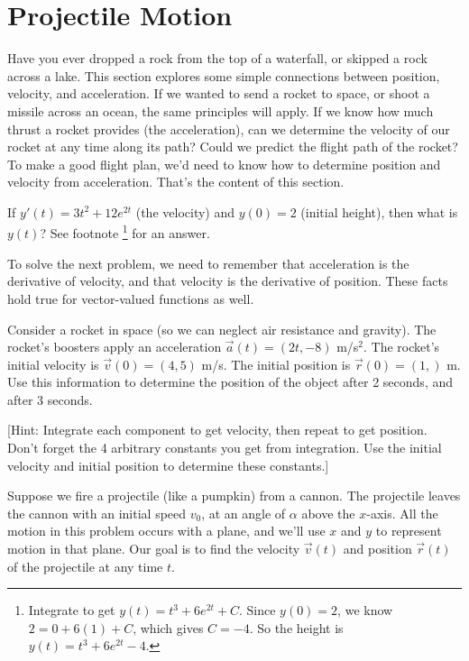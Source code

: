 \section{Projectile Motion}

Have you ever dropped a rock from the top of a waterfall, or skipped a rock across a lake. This section explores some simple connections between position, velocity, and acceleration. If we wanted to send a rocket to space, or shoot a missile across an ocean, the same principles will apply. If we know how much thrust a rocket provides (the acceleration), can we determine the velocity of our rocket at any time along its path?  Could we predict the flight path of the rocket? To make a good flight plan, we'd need to know how to determine position and velocity from acceleration.  That's the content of this section.  

\begin{review*}
 If $y'(t) = 3t^2+12e^{2t}$ (the velocity) and $y(0)=2$ (initial height), then what is $y(t)$? See footnote \footnote{Integrate to get $y(t) = t^3+6e^{2t}+C$. Since $y(0)=2$, we know $2=0+6(1)+C$, which gives $C=-4$. So the height is $y(t) = t^3+6e^{2t}-4$. } for an answer. 
\end{review*}


To solve the next problem, we need to remember that acceleration is the derivative of velocity, and that velocity is the derivative of position.  These facts hold true for vector-valued functions as well.


\begin{problem}
Consider a rocket in space (so we can neglect air resistance and gravity). The rocket's boosters apply an acceleration $\vec a(t) = (2t,-8)$ m/s$^2$. The rocket's initial velocity is $\vec v(0) = (4,5)$ m/s.  The initial position is $\vec r(0) = (1,)$ m. Use this information to determine the position of the object after 2 seconds, and after 3 seconds. 

[Hint: Integrate each component to get velocity, then repeat to get position. Don't forget the 4 arbitrary constants you get from integration. Use the initial velocity and initial position to determine these constants.]
\end{problem}

Suppose we fire a projectile (like a pumpkin) from a cannon. The projectile leaves the cannon with an initial speed $v_0$, at an angle of $\alpha$ above the $x$-axis. All the motion in this problem occurs with a plane, and we'll use $x$ and $y$ to represent motion in that plane. Our goal is to find the velocity $\vec v(t)$ and position $\vec r(t)$  of the projectile at any time $t$. 

